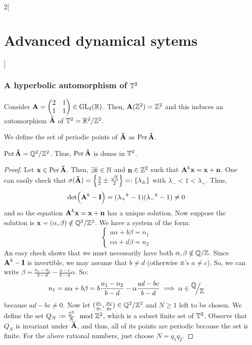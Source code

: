 \documentclass[../../../main_math.tex]{subfiles}
\begin{document}
\begin{multicols}{2}[\section{Advanced dynamical sytems}]
  \subsubsection{A hyperbolic automorphism of \texorpdfstring{$\mathbb{T}^2$}{T2}}
  \begin{proposition}
    Consider $\boldsymbol{\mathrm{A}}=\begin{pmatrix}
        2 & 1 \\
        1 & 1
      \end{pmatrix}\in \mathrm{GL}_2(\mathbb{R})$. Then, $\boldsymbol{\mathrm{A}}(\mathbb{Z}^2)=\mathbb{Z}^2$ and this induces an automorphism $\boldsymbol{\mathrm{\tilde{A}}}$ of $\TT^2=\quot{\RR^2}{\ZZ^2}$.
  \end{proposition}
  \begin{definition}
    We define the set of periodic points of $\boldsymbol{\mathrm{\tilde{A}}}$ as $\operatorname{Per}\boldsymbol{\mathrm{\tilde{A}}}$.
  \end{definition}
  \begin{lemma}
    $\Per\vf{\tilde{A}}=\quot{\QQ^2}{\ZZ^2}$. Thus, $\operatorname{Per}\boldsymbol{\mathrm{\tilde{A}}}$ is dense in $\mathbb{T}^2$.
  \end{lemma}
  \begin{proof}
    Let $\boldsymbol{\mathrm{x}}\in \operatorname{Per}\boldsymbol{\mathrm{\tilde{A}}}$. Then, $\exists k\in\mathbb{N}$ and $\boldsymbol{\mathrm{n}}\in\mathbb{Z}^2$ such that $\boldsymbol{\mathrm{A}}^k\boldsymbol{\mathrm{x}}=\boldsymbol{\mathrm{x}}+\boldsymbol{\mathrm{n}}$. One can easily check that $\sigma(\boldsymbol{\mathrm{\tilde{A}}})=\left\{\frac{3}{2}\pm \frac{\sqrt{5}}{2}\right\}=:\{\lambda_{\pm}\}$ with $\lambda_-<1<\lambda_+$. Thus,
    $$
      \det(\boldsymbol{\mathrm{A}}^k-\boldsymbol{\mathrm{I}})=({\lambda_+}^k-1)({\lambda_-}^k-1)\ne 0
    $$
    and so the equation $\boldsymbol{\mathrm{A}}^k\boldsymbol{\mathrm{x}}=\boldsymbol{\mathrm{x}}+\boldsymbol{\mathrm{n}}$ has a unique solution. Now suppose the solution is $\vf{x}=(\alpha,\beta)\notin\quot{\QQ^2}{\ZZ^2}$. We have a system of the form:
    $$
      \begin{cases}
        a\alpha + b\beta = n_1 \\
        c\alpha + d\beta = n_2
      \end{cases}
    $$
    An easy check shows that we must necessarily have both $\alpha,\beta\notin\quot{\QQ}{\ZZ}$. Since $\boldsymbol{\mathrm{A}}^k-\boldsymbol{\mathrm{I}}$ is invertible, we may assume that $b\ne d$ (otherwise it's $a\ne c$). So, we can write $\beta=\frac{n_1-n_2}{b-d}-\frac{a-c}{b-d}\alpha$. So:
    $$
      n_1=a\alpha + b\beta=b\frac{n_1-n_2}{b-d}-\alpha\frac{ad-bc}{b-d}\implies \alpha\in \quot{\QQ}{\ZZ}
    $$
    because $ad-bc\ne 0$. Now let $(\frac{p_1}{q_1},\frac{p_2}{q_2})\in \quot{\QQ^2}{\ZZ^2}$ and $N\geq 1$ left to be chosen. We define the set $Q_N:=\frac{\mathbb{Z}^2}{N} \mod{\mathbb{Z}^2}$, which is a subset finite set of $\mathbb{T}^2$. Observe that $Q_N$ is invariant under $\boldsymbol{\mathrm{\tilde{A}}}$, and thus, all of its points are periodic because the set is finite. For the above rational numbers, just choose $N=q_1q_2$.

\end{proof}
\end{multicols}
\end{document}

